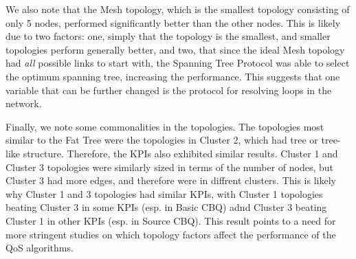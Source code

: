 We also note that the Mesh topology, which is the smallest topology consisting of only 5 nodes, performed significantly better than the other nodes. This is likely due to two factors: one, simply that the topology is the smallest, and smaller topologies perform generally better, and two, that since the ideal Mesh topology had \textit{all} possible links to start with, the Spanning Tree Protocol was able to select the optimum spanning tree, increasing the performance. This suggests that one variable that can be further changed is the protocol for resolving loops in the network.

Finally, we note some commonalities in the topologies. The topologies most similar to the Fat Tree were the topologies in Cluster 2, which had tree or tree-like structure. Therefore, the KPIs also exhibited similar results. Cluster 1 and Cluster 3 topologies were similarly sized in terms of the number of nodes, but Cluster 3 had more edges, and therefore were in diffrent clusters. This is likely why Cluster 1 and 3 topologies had similar KPIs, with Cluster 1 topologies beating Cluster 3 in some KPIs (esp. in Basic CBQ) adnd Cluster 3 beating Cluster 1 in other KPIs (esp. in Source CBQ). This result points to a need for more stringent studies on which topology factors affect the performance of the QoS algorithms.
